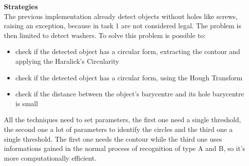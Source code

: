 \documentclass[11pt]{article}
\begin{document}
    \textbf{Strategies} \\
The previous implementation already detect objects
without holes like screws, raising an exception, because in task 1 are
not considered legal. The problem is then limited to detect washers. To
solve this problem is possible to:
\begin{itemize}
    \item check if the detected object has a
circular form, extracting the contour and applying the Haralick's
Circularity
    \item check if the detected object has a circular form, using
the Hough Transform
    \item check if the distance between the object's
barycentre and its hole barycentre is small
\end{itemize}

All the techniques need to set parameters, the first one need a single
threshold, the second one a lot of parameters to identify the circles
and the third one a single threshold. The first one needs the contour
while the third one uses informations gained in the normal process of
recognition of type A and B, so it's more computationally efficient.
\end{document}
